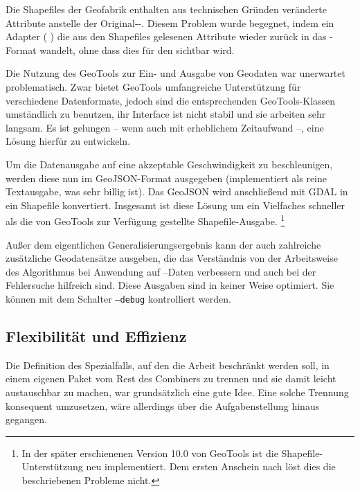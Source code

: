 \documentclass[../main/thesis.tex]{subfiles}
\begin{document}
Die Shapefiles der Geofabrik enthalten aus technischen Gründen veränderte Attribute anstelle der Original-\osm-.
Diesem Problem wurde begegnet, indem ein Adapter ( ) die aus den Shapefiles gelesenen Attribute wieder zurück in das \osm-Format wandelt, ohne dass dies für den  sichtbar wird.

Die Nutzung des  GeoTools zur Ein- und Ausgabe von Geodaten war unerwartet problematisch.
Zwar bietet GeoTools umfangreiche Unterstützung für verschiedene Datenformate, jedoch sind die entsprechenden GeoTools-Klassen umständlich zu benutzen, ihr Interface ist nicht stabil und sie arbeiten sehr langsam.
Es ist gelungen -- wenn auch mit erheblichem Zeitaufwand --, eine Lösung hierfür zu entwickeln.

Um die Datenausgabe auf eine akzeptable Geschwindigkeit zu beschleunigen, werden diese nun im GeoJSON-Format ausgegeben (implementiert als reine Textausgabe, was sehr billig ist).
Das GeoJSON wird anschließend mit GDAL in ein Shapefile konvertiert.
Insgesamt ist diese Lösung um ein Vielfaches schneller als die von GeoTools zur Verfügung gestellte Shapefile-Ausgabe.%
\footnote{In der später erschienenen Version 10.0 von GeoTools ist die Shapefile-Unterstützung neu implementiert.  Dem ersten Anschein nach löst dies die beschriebenen Probleme nicht.}

Außer dem eigentlichen Generalisierungsergebnis kann der  auch zahlreiche zusätzliche Geodatensätze ausgeben, die das Verständnis von der Arbeitsweise des Algorithmus bei Anwendung auf --Daten verbessern und auch bei der Fehlersuche hilfreich sind.
Diese Ausgaben sind in keiner Weise optimiert.
Sie können mit dem Schalter \texttt{--debug} kontrolliert werden.



\subsection{Flexibilität und Effizienz}
\label{ch:impl-flexibility-efficiency}

Die Definition des Spezialfalls, auf den die Arbeit beschränkt werden soll, in einem eigenen Paket  vom Rest des Combiners zu trennen und sie damit leicht austauschbar zu machen, war grundsätzlich eine gute Idee.
Eine solche Trennung konsequent umzusetzen, wäre allerdings über die Aufgabenstellung hinaus gegangen.
\end{document}
